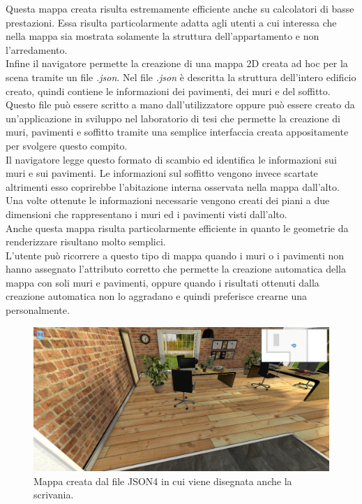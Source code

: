 Questa mappa creata risulta estremamente efficiente anche su calcolatori di basse prestazioni. Essa risulta particolarmente adatta agli utenti a cui interessa che nella mappa sia mostrata solamente la struttura dell’appartamento e non l’arredamento.
\\

Infine il navigatore permette la creazione di una mappa 2D creata ad hoc per la scena tramite un file \emph{.json}.
Nel file \emph{.json} è descritta la struttura dell’intero edificio creato, quindi contiene le informazioni dei pavimenti, dei muri e del soffitto.
\\
Questo file può essere scritto a mano dall’utilizzatore oppure può essere creato da un’applicazione in sviluppo nel laboratorio di tesi che permette la creazione di muri, pavimenti e soffitto tramite una semplice interfaccia creata appositamente per svolgere questo compito.
\\
Il navigatore legge questo formato di scambio ed identifica le informazioni sui muri e sui pavimenti. Le informazioni sul soffitto vengono invece scartate altrimenti esso coprirebbe l’abitazione interna osservata nella mappa dall’alto.
Una volte ottenute le informazioni necessarie vengono creati dei piani a due dimensioni che rappresentano i muri ed i pavimenti visti dall’alto.
\\
Anche questa mappa risulta particolarmente efficiente in quanto le geometrie da renderizzare risultano molto semplici.
\\
L’utente può ricorrere a questo tipo di mappa quando i muri o i pavimenti non hanno assegnato l’attributo corretto che permette la creazione automatica della mappa con soli muri e pavimenti, oppure quando i risultati ottenuti dalla creazione automatica non lo aggradano e quindi preferisce crearne una personalmente.
\begin{figure}[htb]
 \centering
 \includegraphics[width=1\linewidth]{images/chapter_navigazione_scena/map_2d_json.png}\hfill
 \caption[Mappa creata dal file JSON4.]{Mappa creata dal file JSON4 in cui viene disegnata anche la scrivania.}
 \label{fig:navigazione_scena_map_2d_json}
\end{figure}
